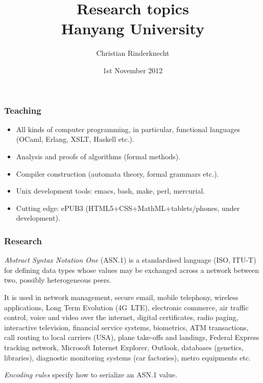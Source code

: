 \documentclass[compress,dvips,xcolor={dvipsnames},t]{beamer}
\title{Research topics\\
Hanyang University}
\author{Christian Rinderknecht}
\date{1st November 2012}
\newcommand\ASN{\textsf{ASN.1}\xspace}
\begin{document}
\frame{\maketitle}

\begin{frame}
\frametitle{Teaching}

\begin{itemize}

  \item All kinds of computer programming, in particular, functional
  languages (OCaml, Erlang, XSLT, Haskell etc.).

  \item Analysis and proofs of algorithms (formal methods).

  \item Compiler construction (automata theory, formal grammars etc.).

  \item Unix development tools: emacs, bash, make, perl, mercurial.

  \item Cutting edge: ePUB3 (HTML5+CSS+MathML+tablets/phones, under
    development).

\end{itemize}

\end{frame}


\begin{frame}
\frametitle{Research}

\emph{Abstract Syntax Notation One} (\ASN) is a standardised language
(ISO, ITU-T) for defining data types whose values may be exchanged
across a network between two, possibly heterogeneous peers.

\bigskip

It is used in network management, secure email, mobile telephony, wireless applications, Long Term Evolution (4G~LTE), electronic commerce, air traffic control, voice and video over the internet, digital certificates, radio paging, interactive television, financial service systems, biometrics, ATM transactions, call routing to local carriers (USA), plane take-offs and landings, Federal Express tracking network, Microsoft Internet Explorer, Outlook, databases (genetics, libraries), diagnostic monitoring systems (car factories), metro equipments etc.

\bigskip

\emph{Encoding rules} specify how to serialize an \ASN value.

\end{frame}
\end{document}
